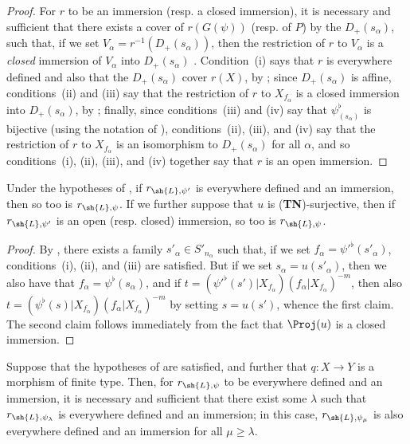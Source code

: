 \begin{proof}
For $r$ to be an immersion (resp. a closed immersion), it is necessary and sufficient that there exists a cover of $r(G(\psi))$ (resp. of $P$) by the $D_+(s_\alpha)$, such that, if we set $V_\alpha=r^{-1}(D_+(s_\alpha))$, then the restriction of $r$ to $V_\alpha$ is a \emph{closed} immersion of $V_\alpha$ into $D_+(s_\alpha)$ .
Condition~(i) says that $r$ is everywhere defined and also that the $D_+(s_\alpha)$ cover $r(X)$, by ;
since $D_+(s_\alpha)$ is affine, conditions~(ii) and (iii) say that the restriction of $r$ to $X_{f_\alpha}$ is a closed immersion into $D_+(s_\alpha)$, by ;
finally, since conditions~(iii) and (iv) say that $\psi_{(s_\alpha)}^\flat$ is bijective (using the notation of ), conditions~(ii), (iii), and (iv) say that the restriction of $r$ to $X_{f_\alpha}$ is an isomorphism to $D_+(s_\alpha)$ for all $\alpha$, and so conditions~(i), (ii), (iii), and (iv) together say that $r$ is an open immersion.
\end{proof}

\begin{corollary}[3.8.3]
\label{II.3.8.3}
Under the hypotheses of , if $r_{\sh{L},\psi'}$ is everywhere defined and an immersion, then so too is $r_{\sh{L},\psi}$.
If we further suppose that $u$ is (\textbf{TN})-surjective, then if $r_{\sh{L},\psi'}$ is an open (resp. closed) immersion, so too is $r_{\sh{L},\psi}$.
\end{corollary}

\begin{proof}
By , there exists a family $s'_\alpha\in S'_{n_\alpha}$ such that, if we set $f_\alpha=\psi'^\flat(s'_\alpha)$, conditions~(i), (ii), and (iii) are satisfied.
But if we set $s_\alpha=u(s'_\alpha)$, then we also have that $f_\alpha=\psi^\flat(s_\alpha)$, and if $t=(\psi'^\flat(s')|X_{f_\alpha})(f_\alpha|X_{f_\alpha})^{-m}$, then also $t=(\psi^\flat(s)|X_{f_\alpha})(f_\alpha|X_{f_\alpha})^{-m}$ by setting $s=u(s')$, whence the first claim.
The second claim follows immediately from the fact that $\Proj(u)$ is a closed immersion.
\end{proof}

\begin{proposition}[3.8.4]
\label{II.3.8.4}
Suppose that the hypotheses of  are satisfied, and further that $q:X\to Y$ is a morphism of finite type.
Then, for $r_{\sh{L},\psi}$ to be everywhere defined and an immersion, it is necessary and sufficient that there exist some $\lambda$ such that $r_{\sh{L},\psi_\lambda}$ is everywhere defined and an immersion;
in this case, $r_{\sh{L},\psi_\mu}$ is also everywhere defined and an immersion for all $\mu\geq\lambda$.
\end{proposition}

